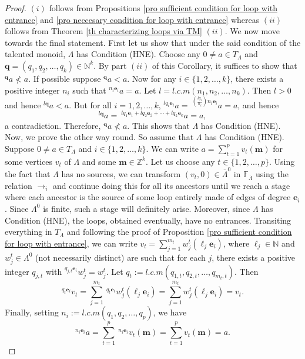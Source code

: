 \documentclass[a4paper,reqno,12pt]{amsart}
\numberwithin{equation}{section}
\theoremstyle{definition}
\theoremstyle{remark}
\newcommand{\M}{\mathbf{m}}
\begin{document}
\begin{proof}
$(i)$ follows from Propositions \ref{pro sufficient condition for loop with entrance} and \ref{pro neccesary condition for loop with entrance} whereas $(ii)$ follows from Theorem \ref{th characterizing loops via TM} $(ii)$. We now move towards the final statement. First let us show that under the said condition of the talented monoid, $\Lambda$ has Condition (HNE). Choose any $0\neq a\in T_\Lambda$ and $\mathbf{q}=(q_1,q_2,\ldots,q_k)\in \mathbb{N}^k$. By part $(ii)$ of this Corollary, it suffices to show that $^\mathbf{q} a\nless a$. If possible suppose $^\mathbf{q}a<a$. Now for any $i\in \{1,2,\ldots,k\}$, there exists a positive integer $n_i$ such that $^{n_i\mathbf{e}_i}a=a$. Let $l=l.c.m(n_1,n_2,\ldots,n_k)$. Then $l>0$ and hence $^{l\mathbf{q}}a<a$. But for all $i=1,2,\ldots,k$, $^{lq_i\mathbf{e}_i}a=~^{(\frac{l q_i}{n_i})n_i\mathbf{e}_i}a=a$, and hence \[^{l\mathbf{q}}a=~^{lq_1\mathbf{e}_1+lq_2\mathbf{e}_2+\cdots+lq_k\mathbf{e}_k}a=a,\] a contradiction. Therefore, $^\mathbf{q}a\nless a$. This shows that $\Lambda$ has Condition (HNE). Now, we prove the other way round. So assume that $\Lambda$ has Condition (HNE). Suppose $0\neq a\in T_\Lambda$ and $i\in \{1,2,\ldots,k\}$. We can write $a=\displaystyle{\sum_{t=1}^{p}} v_t(\M)$ for some vertices $v_t$ of $\Lambda$ and some $\M\in \mathbb{Z}^k$. Let us choose any $t\in \{1,2,\ldots,p\}$. Using the fact that $\Lambda$ has no sources, we can transform $(v_t,0)\in \overline{\Lambda}^0$ in $\mathbb{F}_{\overline{\Lambda}}$ using the relation $\longrightarrow_i$ and continue doing this for all its ancestors until we reach a stage where each ancestor is the source of some loop entirely made of edges of degree $\mathbf{e}_i$. Since $\Lambda^0$ is finite, such a stage will definitely arise. Moreover, since $\Lambda$ has Condition (HNE), the loops, obtained eventually, have no entrances. Transiting everything in $T_\Lambda$ and following the proof of Proposition \ref{pro sufficient condition for loop with entrance}, we can write $v_t=\displaystyle{\sum_{j=1}^{m_t}}w_j^t(\ell_j\mathbf{e}_i)$, where $\ell_j\in \mathbb{N}$ and $w_j^t\in \Lambda^0$ (not necessarily distinct) are such that for each $j$, there exists a positive integer $q_{j,t}$ with $^{q_{j,t}\mathbf{e}_i}w_j^t=w_j^t$. Let $q_t:=l.c.m(q_{1,t},q_{2,t},\ldots,q_{{m_t},t})$. Then \[^{q_t\mathbf{e}_i}v_t=\displaystyle{\sum_{j=1}^{m_t}}~^{q_t\mathbf{e}_i}w_j^t(\ell_j\mathbf{e}_i)=\displaystyle{\sum_{j=1}^{m_t}}w_j^t(\ell_j\mathbf{e}_i)=v_t.\] Finally, setting $n_i:=l.c.m(q_1,q_2,\ldots,q_p)$, we have \[^{n_i\mathbf{e}_i}a=\displaystyle{\sum_{t=1}^{p}}~^{n_i\mathbf{e}_i}v_t(\M)=\displaystyle{\sum_{t=1}^{p}}v_t(\M)=a.\]  
\end{proof}
\end{document}

